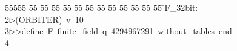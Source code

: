 %
%
\begin{tabbing}
55555 \= 55 \= 55 \= 55 \= 55 \= 55 \= 55 \= 55 \= 55 \= 55 \= 55 \= 55 \= 55 \= \>F\_32bit:\\[0pt]
2\>$\triangleright$\>(ORBITER)\ v\ 10\ \\[0pt]
3\>$\triangleright$\>$\triangleright$\>define\ F\ finite\_field\ q\ 4294967291\ without\_tables\ end\ \\[0pt]
4\>\end{tabbing}
